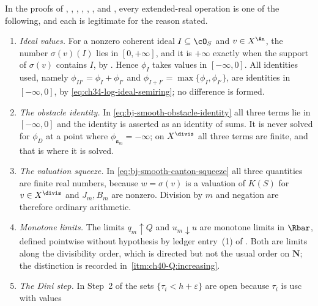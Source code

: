 \begin{proposition}
\label{prop:ch40-safeguards}
In the proofs of ,
, ,
,
,
,
 and
, every extended-real operation is one of the
following, and each is legitimate for the reason stated.
\begin{enumerate}
\item\label{itm:ch40-safe:ideal}
 \emph{Ideal values.}  For a nonzero coherent ideal $I\subseteq\cO_S$ and
 $v\in X^{\An}$, the number $\sigma(v)(I)$ lies in $[0,+\infty]$, and
 it is $+\infty$ exactly when the support of $\sigma(v)$ contains $I$,
 by .  Hence
 $\phi_I$ takes values in $[-\infty,0]$.  All identities used, namely
 $\phi_{II'}=\phi_I+\phi_{I'}$ and
 $\phi_{I+I'}=\max\{\phi_I,\phi_{I'}\}$, are identities in
 $[-\infty,0]$, by \eqref{eq:ch34-log-ideal-semiring}; no difference is
 formed.
\item\label{itm:ch40-safe:identity}
 \emph{The obstacle identity.}  In
 \eqref{eq:bj-smooth-obstacle-identity} all three terms lie in
 $[-\infty,0]$ and the identity is asserted as an identity of sums.  It is
  never solved for $\phi_D$ at a point where
 $\phi_{\mathfrak a_m}=-\infty$; on $X^{\divis}$ all three terms are
 finite, and that is where it is solved.
\item\label{itm:ch40-safe:squeeze}
 \emph{The valuation squeeze.}  In
 \eqref{eq:bj-smooth-canton-squeeze} all three quantities are finite real
 numbers, because $w=\sigma(v)$ is a valuation of $K(S)$ for
 $v\in X^{\divis}$ and $J_m,B_m$ are nonzero.  Division by $m$ and
 negation are therefore ordinary arithmetic.
\item\label{itm:ch40-safe:limits}
 \emph{Monotone limits.}  The limits $q_m\uparrow Q$ and
 $u_m\downarrow u$ are monotone limits in $\Rbar$, defined pointwise
 without hypothesis by ledger entry~(1) of
 .  Both are limits along the divisibility
 order, which is directed but not the usual order on $\mathbf N$; the
 distinction is recorded in
 \,\cref{itm:ch40-Q:increasing}.
\item\label{itm:ch40-safe:dini}
 \emph{The Dini step.}  In Step~2 of
  the sets
 $\{\tau_i<h+\varepsilon\}$ are open because $\tau_i$ is usc with values

\end{enumerate}
\end{proposition}
